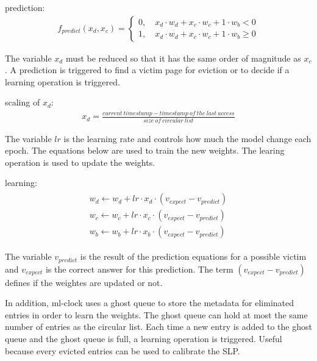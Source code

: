 \documentclass[
	12pt,
	a4paper,
	abstract,
	bibliography=totoc,
	chapterprefix,
	headings=openright,
	numbers=endperiod,
	parskip=half,
	twoside,
]{scrreprt}
\begin{document}
prediction: \\
\begin{align}
	f_{predict} (x_d, x_c) =
	\begin{cases}
		0, \quad x_d \cdot w_d + x_c \cdot w_c + 1 \cdot w_b < 0 \\
		1, \quad x_d \cdot w_d + x_c \cdot w_c + 1 \cdot w_b \geq 0
	\end{cases}
\end{align}

The variable $x_d$ must be reduced so that it has the same order of magnitude as $x_c$.
A prediction is triggered to find a victim page for eviction or to decide if a learning operation is triggered.

scaling of $x_d$:
\begin{align}
	x_d = \frac{current \  timestamp - timestamp \  of \  the \  last \  access}{size \  of \  circular \  list}
\end{align}
	
The variable $lr$ is the learning rate and controls how much the model change each epoch.
The equations below are used to train the new weights.
The learing operation is used to update the weights.

learning:
\begin{align}
\begin{split}
	w_d \leftarrow w_d + lr \cdot x_d \cdot (v_{expect} - v_{predict})\\
	w_c \leftarrow w_c + lr \cdot x_c \cdot (v_{expect} - v_{predict})\\
	w_b \leftarrow w_b + lr \cdot x_b \cdot (v_{expect} - v_{predict})
\end{split}
\end{align}

The variable $v_{predict}$ is the result of the prediction equations for a possible victim and 
$v_{expect}$ is the correct answer for this prediction.
The term $(v_{expect} - v_{predict})$ defines if the weightes are updated or not.

In addition, ml-clock uses a ghost queue to store the metadata for eliminated entries in order to learn the weights.
The ghost queue can hold at most the same number of entries as the circular list.
Each time a new entry is added to the ghost queue and the ghost queue is full, a learning operation is triggered.
Useful because every evicted entries can be used to calibrate the SLP.

\end{document}
